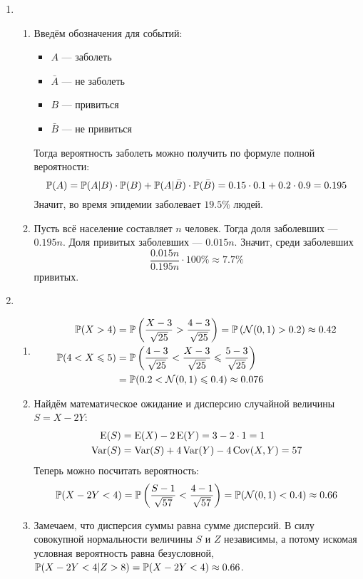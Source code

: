 \begin{enumerate}
\item
\begin{enumerate}
\item Введём обозначения для событий:
\begin{itemize}
  \item $A$ — заболеть
  \item $\bar A$ — не заболеть
  \item $B$ — привиться
  \item $\bar B$ — не привиться
\end{itemize}

Тогда вероятность заболеть можно получить по формуле полной вероятности:
\[
\P(A) = \P(A | B) \cdot \P(B)  + \P(A | \bar B) \cdot \P(\bar B) = 0.15 \cdot 0.1 + 0.2 \cdot 0.9 = 0.195
\]
Значит, во время эпидемии заболевает $19.5\%$ людей.
\item Пусть всё население составляет $n$ человек.
Тогда доля заболевших — $0.195 n$.
Доля привитых заболевших — $0.015 n$.
Значит, среди заболевших
\[
\frac{0.015 n}{0.195 n} \cdot 100 \% \approx 7.7 \%
\]
привитых.
\end{enumerate}
\item
\begin{enumerate}
\item
\begin{align*}
\P(X > 4) &= \P\left(\frac{X - 3}{\sqrt{25}} > \frac{4 - 3}{\sqrt{25}} \right) = \P\left(\cN(0,1) > 0.2\right) \approx 0.42 \\
\P(4 < X \leq 5) &= \P \left(\frac{4 - 3}{\sqrt{25}} < \frac{X - 3}{\sqrt{25}} \leq \frac{5 - 3}{\sqrt{25}} \right)  \\
&= \P(0.2 < \cN(0,1) \leq 0.4) \approx 0.076
\end{align*}
\item Найдём математическое ожидание и дисперсию случайной величины $S = X - 2Y$:
\begin{align*}
\E(S) &= \E(X) - 2\E(Y) = 3 - 2 \cdot 1 = 1 \\
\Var(S) &= \Var(S)  + 4 \Var(Y) - 4 \Cov(X, Y) = 57
\end{align*}
Теперь можно посчитать вероятность:
\[
\P(X - 2Y < 4) = \P \left(\frac{S - 1}{\sqrt{57}} < \frac{4 - 1}{\sqrt{57}} \right) = \P(\cN(0, 1) < 0.4) \approx 0.66
\]
\item Замечаем, что дисперсия суммы равна сумме дисперсий. 
В силу совокупной нормальности величины $S$ и $Z$ независимы, а потому искомая условная вероятность равна безусловной,
$\P(X - 2Y < 4 | Z > 8 ) = \P(X - 2Y < 4) \approx 0.66$.

\end{enumerate}
\end{enumerate}
